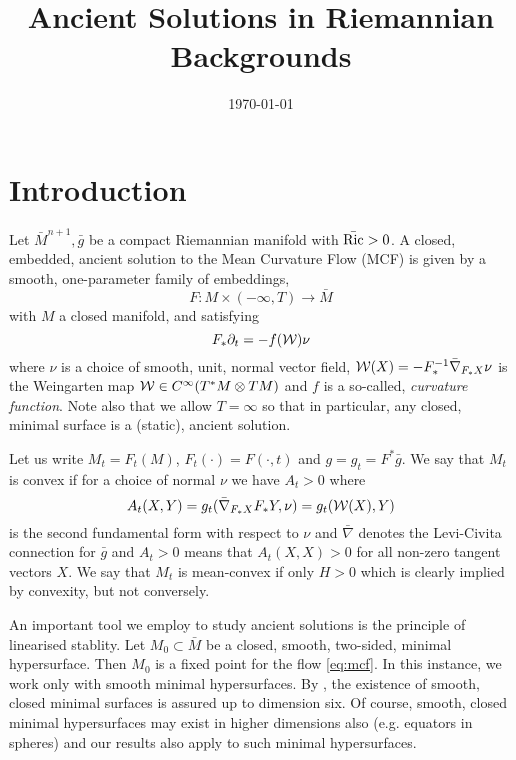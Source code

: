 \documentclass{amsart}
\begin{document}
\title[Ancient Solutions]
 {Ancient Solutions in Riemannian Backgrounds}

\curraddr{}
\email{}
\date{\today}

\dedicatory{}
\subjclass[2010]{}
\keywords{}

\begin{abstract}
\end{abstract}

\maketitle

\section{Introduction}
\label{sec:intro}

Let \(\bar{M}^{n+1}, \bar{g}\) be a compact Riemannian manifold with \(\bar{\operatorname{Ric}} > 0\). A closed, embedded, ancient solution to the Mean Curvature Flow (MCF) is given by a smooth, one-parameter family of embeddings,
\[
F : M \times (-\infty, T) \to \bar{M}
\]
with \(M\) a closed manifold, and satisfying
\begin{equation}
\label{eq:mcf}
F_{\ast} \partial_t = -f(\operatorname{\mathcal{W}}) \nu
\end{equation}
where \(\nu\) is a choice of smooth, unit, normal vector field, \(\operatorname{\mathcal{W}} (X) = -F_{\ast}^{-1} \bar{\nabla}_{F_{\ast} X} \nu\) is the Weingarten map \(\operatorname{\mathcal{W}} \in C^{\infty}(T^{\ast}M \otimes TM)\) and \(f\) is a so-called, \emph{curvature function}. Note also that we allow \(T = \infty\) so that in particular, any closed, minimal surface is a (static), ancient solution.

Let us write \(M_t = F_t(M)\), \(F_t (\cdot) = F(\cdot, t)\) and \(g = g_t = F^{\ast} \bar{g}\). We say that \(M_t\) is convex if for a choice of normal \(\nu\) we have \(A_t>0\) where
\[
A_t (X, Y) = g_t (\bar{\nabla}_{F_{\ast} X} F_{\ast} Y, \nu) = g_t(\operatorname{\mathcal{W}}(X), Y)
\]
is the second fundamental form with respect to \(\nu\) and \(\bar{\nabla}\) denotes the Levi-Civita connection for \(\bar{g}\) and \(A_t > 0\) means that \(A_t(X, X) > 0\) for all non-zero tangent vectors \(X\). We say that \(M_t\) is mean-convex if only \(H > 0\) which is clearly implied by convexity, but not conversely.

An important tool we employ to study ancient solutions is the principle of linearised stablity. Let \(M_0 \subset \bar{M}\) be a closed, smooth, two-sided, minimal hypersurface. Then \(M_0\) is a fixed point for the flow \eqref{eq:mcf}. In this instance, we work only with smooth minimal hypersurfaces. By \cite{pitts:/1983}, the existence of smooth, closed minimal surfaces is assured up to dimension six. Of course, smooth, closed minimal hypersurfaces may exist in higher dimensions also (e.g. equators in spheres) and our results also apply to such minimal hypersurfaces.
\end{document}

